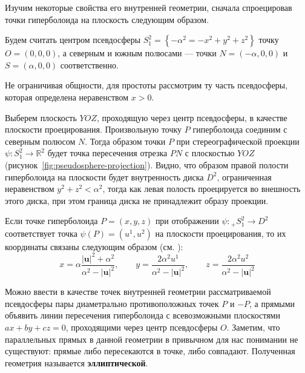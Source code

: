 \documentclass{article}
\numberwithin{equation}{section}
\newcommand{\neword}[1]{\textbf{#1}}
\renewcommand{\vec}{\mathbf}
\providecommand{\abs}[1]{\left \lvert{#1}\right \rvert}
\begin{document}
Изучим некоторые свойства его внутренней геометрии, сначала
спроецировав точки гиперболоида на плоскость следующим образом.

Будем считать центром псевдосферы $S^2_1=\left \{-\alpha^2 = -x^2 + y^2 +
  z^2\right \}$ точку $O=(0, 0, 0)$, а северным и южным полюсами — точки
$N=(-\alpha, 0, 0)$ и $S=(\alpha, 0, 0)$ соответственно.



Не ограничивая общности, для простоты рассмотрим ту часть псевдосферы,
которая определена неравенством $x>0$.

Выберем плоскость $YOZ$, проходящую через центр псевдосферы, в
качестве плоскости проецирования. Произвольную точку $P$ гиперболоида
соединим с северным полюсом $N$. Тогда образом точки $P$ при
стереографической проекции $\psi \colon S^2_1 \to \mathbb{R}^2$ будет
точка пересечения отрезка $PN$ с плоскостью $YOZ$
(рисунок \ref{fig:pseudosphere-projection}). Видно, что образом правой
полости гиперболоида на плоскости будет внутренность диска $D^2$,
ограниченная неравенством $y^2 + z^2 < \alpha^2$, тогда как левая
полость проецируется во внешность этого диска, при этом граница диска
не принадлежит образу проекции.

Если точке гиперболоида $P = (x, y, z)$ при отображении $\psi \colon
{}_+S^2_1 \to D^2$ соответствует точка $\psi(P) = (u^1, u^2)$ на
плоскости проецирования, то их координаты связаны следующим образом
(см. \cite{fomenko00}):
\begin{equation}\label{eq:hyperboloid-to-plane}
  x = \alpha\frac{\abs{\vec{u}}^2 + \alpha^2}{\alpha^2 -
    \abs{\vec{u}}^2}, \qquad
  y = \frac{2 \alpha^2 u^1}{\alpha^2 - \abs{\vec{u}}^2}, \qquad
  z = \frac{2 \alpha^2 u^2}{\alpha^2 - \abs{\vec{u}}^2}
\end{equation}

Можно ввести в качестве точек внутренней геометрии рассматриваемой
псевдосферы пары диаметрально противоположных точек $P$ и $-P$, а
прямыми объявить линии пересечения гиперболоида с всевозможными
плоскостями $ax+by+cz=0$, проходящими через центр псевдосферы $O$.
Заметим, что параллельных прямых в данной геометрии в привычном для
нас понимании не существуют: прямые либо пересекаются в точке, либо
совпадают. Полученная геометрия называется \neword{эллиптической}.
\end{document}
